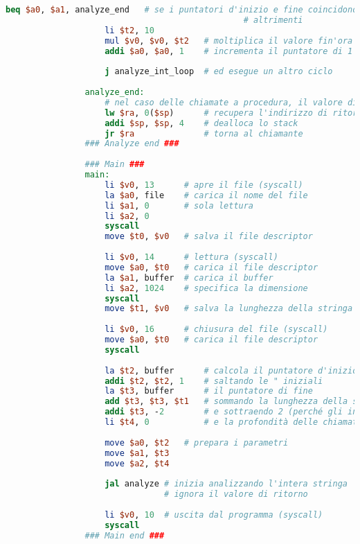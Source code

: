 \begin{center}
\begin{lstlisting}[language=mips, gobble=14, stepnumber=1]
                    beq $a0, $a1, analyze_end   # se i puntatori d'inizio e fine coincidono allora era l'ultimo carattere
                                                # altrimenti
                    li $t2, 10
                    mul $v0, $v0, $t2   # moltiplica il valore fin'ora calcolato per 10
                    addi $a0, $a0, 1    # incrementa il puntatore di 1 (prossimo carattere)
                    
                    j analyze_int_loop  # ed esegue un altro ciclo
                    
                analyze_end:
                    # nel caso delle chiamate a procedura, il valore di ritorno è lo stesso (valore dell'espressione)
                    lw $ra, 0($sp)      # recupera l'indirizzo di ritorno
                    addi $sp, $sp, 4    # dealloca lo stack
                    jr $ra              # torna al chiamante
                ### Analyze end ###
                
                ### Main ###
                main:
                    li $v0, 13      # apre il file (syscall)
                    la $a0, file    # carica il nome del file
                    li $a1, 0       # sola lettura
                    li $a2, 0
                    syscall
                    move $t0, $v0   # salva il file descriptor
                    
                    li $v0, 14      # lettura (syscall)
                    move $a0, $t0   # carica il file descriptor
                    la $a1, buffer  # carica il buffer
                    li $a2, 1024    # specifica la dimensione
                    syscall
                    move $t1, $v0   # salva la lunghezza della stringa
                    
                    li $v0, 16      # chiusura del file (syscall)
                    move $a0, $t0   # carica il file descriptor
                    syscall
                
                    la $t2, buffer      # calcola il puntatore d'inizio
                    addi $t2, $t2, 1    # saltando le " iniziali
                    la $t3, buffer      # il puntatore di fine
                    add $t3, $t3, $t1   # sommando la lunghezza della stringa
                    addi $t3, -2        # e sottraendo 2 (perché gli indici partono da 0 e per evitare le " finali)
                    li $t4, 0           # e la profondità delle chiamate iniziale
                    
                    move $a0, $t2   # prepara i parametri
                    move $a1, $t3
                    move $a2, $t4
                    
                    jal analyze # inizia analizzando l'intera stringa
                                # ignora il valore di ritorno
                    
                    li $v0, 10  # uscita dal programma (syscall)
                    syscall
                ### Main end ###\end{lstlisting}
        \end{center}
		